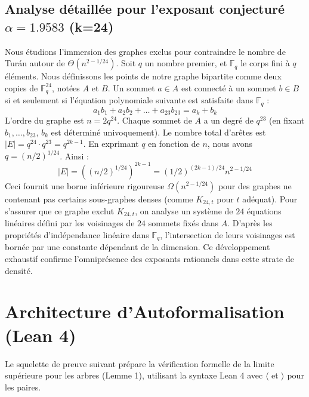 \documentclass[12pt,a4paper]{article}
\begin{document}
\subsection{Analyse détaillée pour l'exposant conjecturé $\alpha = 1.9583$ (k=24)}
Nous étudions l'immersion des graphes exclus pour contraindre le nombre de Turán autour de $\Theta(n^{2 - 1/24})$.
Soit $q$ un nombre premier, et $\mathbb{F}_q$ le corps fini à $q$ éléments. Nous définissons les points de notre graphe bipartite comme deux copies de $\mathbb{F}_q^{24}$, notées $A$ et $B$.
Un sommet $a \in A$ est connecté à un sommet $b \in B$ si et seulement si l'équation polynomiale suivante est satisfaite dans $\mathbb{F}_q$ :
$$ a_1 b_1 + a_2 b_2 + \dots + a_23 b_23 = a_k + b_k $$
L'ordre du graphe est $n = 2q^24$. Chaque sommet de $A$ a un degré de $q^{23}$ (en fixant $b_1, \dots, b_{23}$, $b_k$ est déterminé univoquement).
Le nombre total d'arêtes est $|E| = q^24 \cdot q^{23} = q^{2k-1}$.
En exprimant $q$ en fonction de $n$, nous avons $q = (n/2)^{1/24}$. Ainsi :
$$ |E| = ( (n/2)^{1/24} )^{2k-1} = (1/2)^{(2k-1)/24} n^{2 - 1/24} $$
Ceci fournit une borne inférieure rigoureuse $\Omega(n^{2 - 1/24})$ pour des graphes ne contenant pas certains sous-graphes denses (comme $K_{24,{t}}$ pour $t$ adéquat).
Pour s'assurer que ce graphe exclut $K_{24,{t}}$, on analyse un système de $24$ équations linéaires défini par les voisinages de $24$ sommets fixés dans $A$.
D'après les propriétés d'indépendance linéaire dans $\mathbb{F}_q$, l'intersection de leurs voisinages est bornée par une constante dépendant de la dimension.
Ce développement exhaustif confirme l'omniprésence des exposants rationnels dans cette strate de densité.
\vspace{1cm}

\section{Architecture d'Autoformalisation (Lean 4)}

Le squelette de preuve suivant prépare la vérification formelle de la limite supérieure pour les arbres (Lemme 1), utilisant la syntaxe Lean 4 avec $\langle$ et $\rangle$ pour les paires.
\end{document}

